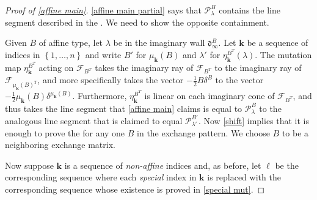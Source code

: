 \documentclass{amsart}
\theoremstyle{definition}
\theoremstyle{remark}
\numberwithin{equation}{section}
\newcommand{\set}[1]{{\left\lbrace #1 \right\rbrace}}
\newcommand{\F}{{\mathcal F}}
\newcommand{\0}{{\mathbf{0}}}
\newcommand{\kk}{\mathbf{k}}
\renewcommand{\ll}{{\boldsymbol\ell}}
\renewcommand{\P}{\mathcal{P}}
\renewcommand{\d}{{\mathfrak d}}
\begin{document}
\begin{proof}[Proof of \cref{affine main}]
\cref{affine main partial} says that $\P_\lambda^B$ contains the line segment described in the .
We need to show the opposite containment.

Given $B$ of affine type, let $\lambda$ be in the imaginary wall $\d_\infty^B$.
Let $\kk$ be a sequence of indices in $\set{1,\ldots,n}$ and write $B'$ for $\mu_\kk(B)$ and $\lambda'$ for $\eta_\kk^{B^T}(\lambda)$.
The mutation map $\eta_\kk^{B^T}$ acting on $\F_{B^T}$ takes the imaginary ray of $\F_{B^T}$ to the imaginary ray of $\F_{\mu_\kk(B)^T}$, and more specifically takes the vector $-\frac12B\delta^B$ to the vector $-\frac12\mu_\kk(B)\delta^{\mu_\kk(B)}$.
Furthermore, $\eta_\kk^{B^T}$ is linear on each imaginary cone of $\F_{B^T}$, and thus takes the line segment that \cref{affine main} claims is equal to $\P_\lambda^B$ to the analogous line segment that is claimed to equal $\P_{\lambda'}^{B'}$.
Now \cref{shift} implies that it is enough to prove the  for any one $B$ in the exchange pattern.
We choose $B$ to be a neighboring exchange matrix.

Now suppose $\kk$ is a sequence of \emph{non-affine} indices and, as before, let $\ll$ be the corresponding sequence where each \emph{special} index in $\kk$ is replaced with the corresponding sequence whose existence is proved in \cref{special mut}.


\end{proof}
\end{document}
